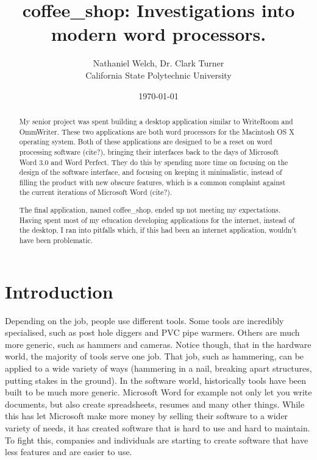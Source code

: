 \documentclass[11pt]{article}
\begin{document}
\title{\vfill coffee\_shop: Investigations into modern word processors.}
\author{
Nathaniel Welch, Dr. Clark Turner\vspace{10pt} \\
California State Polytechnic University\vspace{10pt} \\
}
\date{\today}
\maketitle

\doublespacing

\vfill
\begin{abstract}
My senior project was spent building a desktop application similar to WriteRoom and OmmWriter. These two applications are both word processors for the Macintosh OS X operating system. Both of these applications are designed to be a reset on word processing software (cite?), bringing their interfaces back to the days of Microsoft Word 3.0 and Word Perfect. They do this by spending more time on focusing on the design of the software interface, and focusing on keeping it minimalistic, instead of filling the product with new obscure features, which is a common complaint against the current iterations of Microsoft Word (cite?).

The final application, named coffee\_shop, ended up not meeting my expectations. Having spent most of my education developing applications for the internet, instead of the desktop, I ran into pitfalls which, if this had been an internet application, wouldn't have been problematic.
\end{abstract}

\thispagestyle{empty}
\newpage
\singlespacing
\thispagestyle{empty}
\tableofcontents
\newpage
\doublespacing

\section{Introduction}

Depending on the job, people use different tools. Some tools are incredibly specialised, such as post hole diggers and PVC pipe warmers. Others are much more generic, such as hammers and cameras. Notice though, that in the hardware world, the majority of tools serve one job. That job, such as hammering, can be applied to a wide variety of ways (hammering in a nail, breaking apart structures, putting stakes in the ground). In the software world, historically tools have been built to be much more generic. Microsoft Word for example not only let you write documents, but also create spreadsheets, resumes and many other things. While this has let Microsoft make more money by selling their software to a wider variety of needs, it has created software that is hard to use and hard to maintain. To fight this, companies and individuals are starting to create software that have less features and are easier to use.
\end{document}
